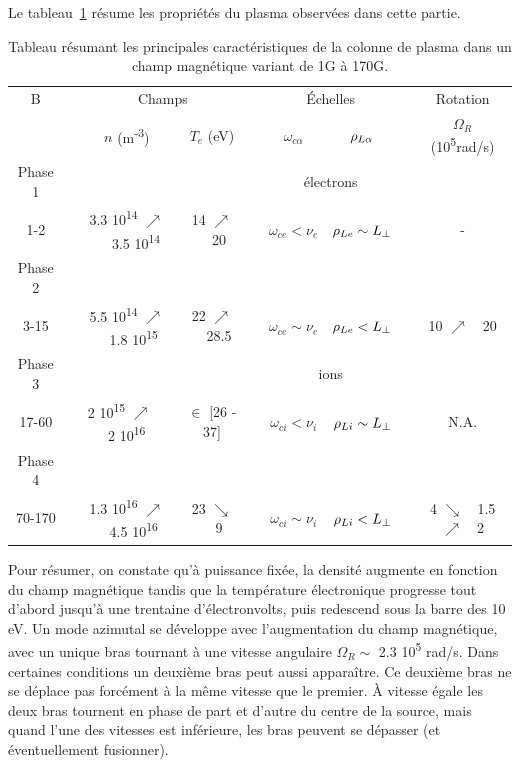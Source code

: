 \begin{refsection}
Le tableau~\ref{4-CybeleVarMagTab} résume les propriétés du plasma observées
dans cette partie.


\begin{table}[!htbp]
\footnotesize\centering
{}
\begin{tabular}{@{}ccccccccc@{}}\toprule
B&&\multicolumn{2}{c}{Champs}&&\multicolumn{2}{c}{Échelles} &&
Rotation\\
\cmidrule{3-4} \cmidrule{6-7} \cmidrule{9-9}
&& $n$ (m\textsuperscript{-3}) & $T_e$ (eV)&& $\omega_{c\alpha}$
&$\rho{_{L\alpha}}$&& $\Omega_R$ (10\textsuperscript{5}rad/s)\\
\midrule Phase 1&&&&&\multicolumn{2}{c}{électrons}\\
\scriptsize 1-2 &&\scriptsize 3.3 10\textsuperscript{14} $\nearrow$~~
\scriptsize 3.5 10\textsuperscript{14} &\scriptsize14 $\nearrow$~~\scriptsize 20 &&
$\omega_{ce}<\nu_e$ &\scriptsize$\rho{_{Le}}\sim L_\perp$ && \scriptsize -
\\
Phase 2\\
\scriptsize 3-15 &&\scriptsize 5.5 10\textsuperscript{14}
$\nearrow$~~\scriptsize 1.8 10\textsuperscript{15} &\scriptsize22
$\nearrow$~~\scriptsize 28.5 && $\omega_{ce}\sim\nu_e$
&\scriptsize$\rho{_{Le}}< L_\perp$ && \scriptsize 10 $\nearrow$~~\scriptsize20
\\
Phase 3 &&&&&\multicolumn{2}{c}{ions}\\
\scriptsize 17-60 &&\scriptsize 2 10\textsuperscript{15} $\nearrow$~~\scriptsize
2 10\textsuperscript{16} &\scriptsize$\in$ \scriptsize [26 - \scriptsize 37]
&& $\omega_{ci}<\nu_i$ &\scriptsize$\rho{_{Li}}\sim L_\perp$ && \scriptsize
N.A.
\\
Phase 4 \\
\scriptsize 70-170 &&\scriptsize 1.3 10\textsuperscript{16}
$\nearrow$~~\scriptsize 4.5 10\textsuperscript{16} &\scriptsize23
$\searrow$~~\scriptsize 9 && $\omega_{ci}\sim\nu_i$
&\scriptsize$\rho{_{Li}}< L_\perp$ && \scriptsize 4 $\searrow$~~\scriptsize1.5$\nearrow$~~\scriptsize2
\\
\bottomrule
\end{tabular}
\caption{Tableau résumant les principales
caractéristiques de la colonne de plasma dans un champ
magnétique variant de 1G à 170G.}\label{4-CybeleVarMagTab}
\end{table}

Pour résumer, on constate qu'à puissance fixée, la densité augmente en
fonction du champ magnétique tandis que la température électronique progresse tout
d'abord jusqu'à une trentaine d'électronvolts, puis redescend sous la barre des
10 eV.
Un mode azimutal se développe avec l'augmentation du champ magnétique, avec un
unique bras tournant à une vitesse angulaire $\Omega_R\sim$ 2.3 10\textsuperscript{5} rad/s. Dans
certaines conditions un deuxième bras peut aussi apparaître. Ce deuxième bras ne
se déplace pas forcément à la même vitesse que le premier. À vitesse égale
les deux bras tournent en phase de part et d'autre du centre de la source, mais
quand l'une des vitesses est inférieure, les bras peuvent se dépasser (et
éventuellement fusionner).


\end{refsection}
